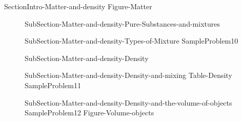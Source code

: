 \documentclass[main.tex]{subfiles}
\begin{document}
\newpage
{SectionIntro-Matter-and-density}
{Figure-Matter}		
\sloppy\begin{description}
\item[]{SubSection-Matter-and-density-Pure-Substances-and-mixtures}
\item[]{SubSection-Matter-and-density-Types-of-Mixture}
{SampleProblem10}
\item[]{SubSection-Matter-and-density-Density}
\item[]{SubSection-Matter-and-density-Density-and-mixing}
{Table-Density} 
{SampleProblem11}
\item[]{SubSection-Matter-and-density-Density-and-the-volume-of-objects}
{SampleProblem12}
{Figure-Volume-objects}
\end{description}
\end{document}
